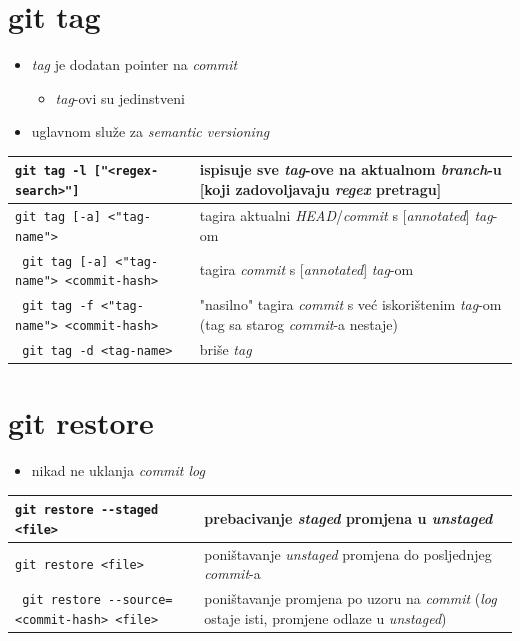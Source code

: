 \documentclass[10pt]{article}
\begin{document}
    \section*{\color{BrickRed} git tag}
    \begin{itemize}
        \item \textit{tag} je dodatan pointer na \textit{commit}
        \begin{itemize}
            \item \textit{tag}-ovi su jedinstveni
        \end{itemize}
        \item uglavnom služe za \textit{semantic versioning}
    \end{itemize}
    \begin{tabular}{|>{\tt}p{9.00cm}|>{}p{15.50cm}|}
        \hline
        git tag -l ["<regex-search>"]                   & ispisuje sve \textit{tag}-ove na aktualnom \textit{branch}-u [koji zadovoljavaju \textit{regex} pretragu] \\ \hline
        git tag [-a] <"tag-name">                       & tagira aktualni \textit{HEAD}/\textit{commit} s [\textit{annotated}] \textit{tag}-om \\ \hline
        git tag [-a] <"tag-name"> <commit-hash>         & tagira \textit{commit} s [\textit{annotated}] \textit{tag}-om \\ \hline
        git tag -f <"tag-name"> <commit-hash>           & "nasilno" tagira \textit{commit} s već iskorištenim \textit{tag}-om (tag sa starog \textit{commit}-a nestaje) \\ \hline
        git tag -d <tag-name>                           & briše \textit{tag} \\ \hline
    \end{tabular}

    \section*{\color{BrickRed} git restore}
    \begin{itemize}
        \item nikad ne uklanja \textit{commit log}
    \end{itemize}
    \begin{tabular}{|>{\tt}p{9.00cm}|>{}p{15.50cm}|}
        \hline
        git restore -{}-staged <file>                   & prebacivanje \textit{staged} promjena u \textit{unstaged} \\ \hline
        git restore <file>                              & poništavanje \textit{unstaged} promjena do posljednjeg \textit{commit}-a \\ \hline
        git restore -{}-source=<commit-hash> <file>     & poništavanje promjena po uzoru na \textit{commit} (\textit{log} ostaje isti, promjene odlaze u \textit{unstaged}) \\ \hline
    \end{tabular}
\end{document}
